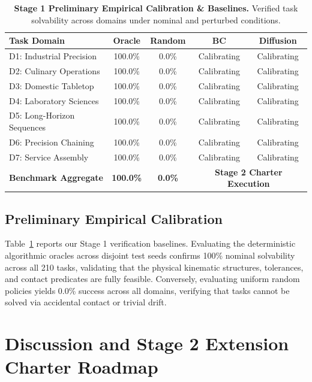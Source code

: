 \documentclass[conference]{IEEEtran}
\begin{document}
\begin{table}[t]
\centering
\caption{\textbf{Stage 1 Preliminary Empirical Calibration \& Baselines.} Verified task solvability across domains under nominal and perturbed conditions.}
\label{tab:prelim_results}
\scriptsize
\setlength{\tabcolsep}{2.5pt}
\renewcommand{\arraystretch}{0.92}
\begin{tabular}{lcccc}
\toprule
\textbf{Task Domain} & \textbf{Oracle} & \textbf{Random} & \textbf{BC} & \textbf{Diffusion} \\
\midrule
D1: Industrial Precision & 100.0\% & 0.0\% & Calibrating & Calibrating \\
D2: Culinary Operations & 100.0\% & 0.0\% & Calibrating & Calibrating \\
D3: Domestic Tabletop & 100.0\% & 0.0\% & Calibrating & Calibrating \\
D4: Laboratory Sciences & 100.0\% & 0.0\% & Calibrating & Calibrating \\
D5: Long-Horizon Sequences & 100.0\% & 0.0\% & Calibrating & Calibrating \\
D6: Precision Chaining & 100.0\% & 0.0\% & Calibrating & Calibrating \\
D7: Service Assembly & 100.0\% & 0.0\% & Calibrating & Calibrating \\
\midrule
\textbf{Benchmark Aggregate} & \textbf{100.0\%} & \textbf{0.0\%} & \multicolumn{2}{c}{\textbf{Stage 2 Charter Execution}} \\
\bottomrule
\end{tabular}
\end{table}

\subsection{Preliminary Empirical Calibration}
Table~\ref{tab:prelim_results} reports our Stage 1 verification baselines. Evaluating the deterministic algorithmic oracles across disjoint test seeds confirms 100\% nominal solvability across all 210 tasks, validating that the physical kinematic structures, tolerances, and contact predicates are fully feasible. Conversely, evaluating uniform random policies yields 0.0\% success across all domains, verifying that tasks cannot be solved via accidental contact or trivial drift.

\section{Discussion and Stage 2 Extension Charter Roadmap}
\label{sec:conclusion}
\end{document}
